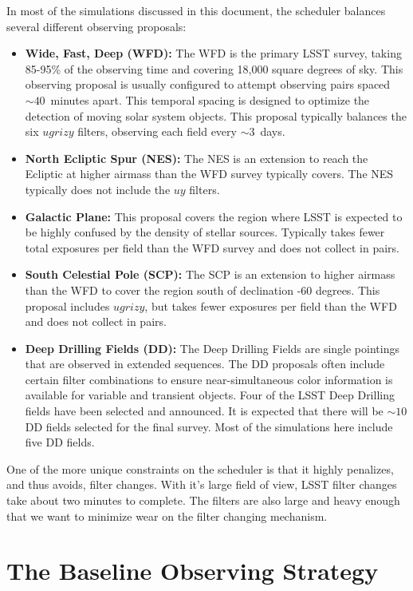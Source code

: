 In most of the simulations discussed in this document, the \OpSim scheduler balances several different observing proposals:
\begin{itemize}
\item {\bf Wide, Fast, Deep (WFD):} The WFD is the primary LSST survey, taking 85-95\% of the observing time and covering 18,000 square degrees of sky. This observing proposal is usually configured to attempt observing pairs spaced $\sim40$\ minutes apart.  This temporal spacing is designed to optimize the detection of moving solar system objects. This proposal typically balances the six $ugrizy$ filters, observing each field every $\sim3$\ days.
\item {\bf North Ecliptic Spur (NES):} The NES is an extension to reach the Ecliptic at higher airmass than the WFD survey typically covers.  The NES typically does not include the $uy$ filters.
\item {\bf Galactic Plane:} This proposal covers the region where LSST is expected to be highly confused by the density of stellar sources.  Typically takes fewer total exposures per field than the WFD survey and does not collect in pairs.
\item {\bf South Celestial Pole (SCP):} The SCP is an extension to higher airmass than the WFD to cover the region south of declination -60 degrees.  This proposal includes $ugrizy$, but takes fewer exposures per field than the WFD and does not collect in pairs.
\item {\bf Deep Drilling Fields (DD):} The Deep Drilling Fields are single pointings that are observed in extended sequences. The DD proposals often include certain filter combinations to ensure near-simultaneous color information is available for variable and transient objects. Four of the LSST Deep Drilling fields have been selected and announced. It is expected that there will be $\sim10$ DD fields selected for the final survey. Most of the simulations here include five DD fields.
\end{itemize}

One of the more unique constraints on the \OpSim scheduler is that it highly penalizes, and thus avoids, filter changes.  With it's large field of view, LSST filter changes take about two minutes to complete. The filters are also large and heavy enough that we want to minimize wear on the filter changing mechanism.

\section{The Baseline Observing Strategy}
\def\secname{cadexp:baseline}\label{sec:\secname}

